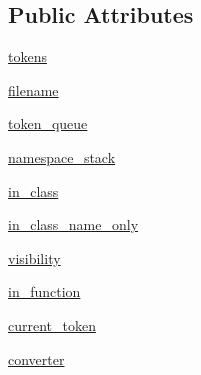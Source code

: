 \subsection*{Public Attributes}
\begin{DoxyCompactItemize}
\item 
\mbox{\hyperlink{classscripts_1_1generator_1_1cpp_1_1ast_1_1_ast_builder_a8bff715105a668075aeb9e9509623b21}{tokens}}
\item 
\mbox{\hyperlink{classscripts_1_1generator_1_1cpp_1_1ast_1_1_ast_builder_a25cc8fa14bd93d009aa5f090c5d4dccc}{filename}}
\item 
\mbox{\hyperlink{classscripts_1_1generator_1_1cpp_1_1ast_1_1_ast_builder_a4a8c6ff53237376e104f1db783b509aa}{token\+\_\+queue}}
\item 
\mbox{\hyperlink{classscripts_1_1generator_1_1cpp_1_1ast_1_1_ast_builder_afa28bf61d2a0e8a44f839c1652fa06e3}{namespace\+\_\+stack}}
\item 
\mbox{\hyperlink{classscripts_1_1generator_1_1cpp_1_1ast_1_1_ast_builder_ac0a39f1899bb14c1a3ec858ef288cd58}{in\+\_\+class}}
\item 
\mbox{\hyperlink{classscripts_1_1generator_1_1cpp_1_1ast_1_1_ast_builder_af498f74ebe8e8996facf99cb4e046749}{in\+\_\+class\+\_\+name\+\_\+only}}
\item 
\mbox{\hyperlink{classscripts_1_1generator_1_1cpp_1_1ast_1_1_ast_builder_a5bcdc6b1797cbb658a270387fa6373ef}{visibility}}
\item 
\mbox{\hyperlink{classscripts_1_1generator_1_1cpp_1_1ast_1_1_ast_builder_ab566d79daa7509aadb30ccafdebb23b8}{in\+\_\+function}}
\item 
\mbox{\hyperlink{classscripts_1_1generator_1_1cpp_1_1ast_1_1_ast_builder_ab7b972a8db8a89c587ed783861ea6a5c}{current\+\_\+token}}
\item 
\mbox{\hyperlink{classscripts_1_1generator_1_1cpp_1_1ast_1_1_ast_builder_a0b9baa71af65c64aeafccf837f93ee2f}{converter}}
\end{DoxyCompactItemize}
